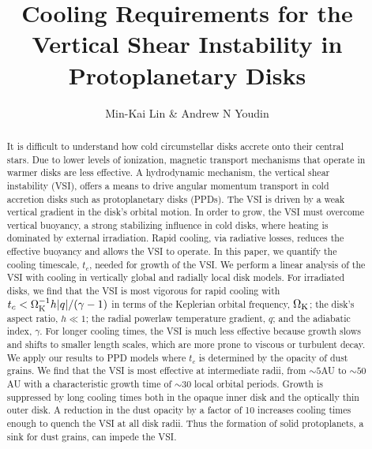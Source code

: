 \documentclass[iop, numberedappendix]{emulateapj}
\def \OmK {\Omega_{\rm K}}
\begin{document}
\title{Cooling Requirements for the Vertical Shear Instability 
  in Protoplanetary Disks}
\author{Min-Kai Lin \& Andrew N Youdin}

\begin{abstract}
  It is difficult to understand how cold circumstellar disks accrete onto their central stars.  Due to 
  lower levels of ionization, magnetic transport mechanisms that
  operate in warmer disks are less effective.  
  A hydrodynamic mechanism, the vertical shear instability (VSI), offers a means to drive angular momentum 
  transport in cold accretion disks such as protoplanetary disks (PPDs).  
  The VSI is driven by a weak vertical gradient in the disk's orbital motion.
  In order to grow, the VSI must overcome vertical buoyancy, a strong
  stabilizing influence in cold disks, where  
  heating is dominated by external irradiation.  Rapid cooling, via
  radiative losses, reduces the effective buoyancy 
  and allows the VSI to operate.  In this paper, we quantify the
  cooling timescale, $t_c$, needed for growth of the VSI.
   We perform a linear analysis of the VSI with cooling in
  vertically global and radially local disk models. 
  For irradiated disks, we find that the VSI is most vigorous for
  rapid cooling with $t_c < \OmK^{-1}  h |q| / (\gamma -1)$ 
  in terms of the Keplerian orbital frequency, $\OmK$; the disk's
  aspect ratio, $ h \ll 1$; the radial  
  powerlaw temperature gradient, $q$; and the adiabatic index,
  $\gamma$.  For longer cooling times, the VSI  
  is much less effective because growth slows and shifts to smaller length scales, which are more prone to 
  viscous or turbulent decay.  We apply our results to PPD models 
  where $t_c$ is determined by the opacity of dust grains.  We
  find that the VSI is most effective at intermediate radii, from $\sim 5$AU to $\sim 50$AU with a
  characteristic growth time of $\sim 30$ local orbital periods.
  Growth is suppressed by long cooling times both in the opaque  
  inner disk and the optically thin outer disk.  A reduction in the
  dust opacity by a factor of 10 increases cooling times  
  enough to quench the VSI at all disk radii.  Thus the formation of
  solid protoplanets, a sink for dust grains, can impede the VSI. 
\end{abstract}
\end{document}
